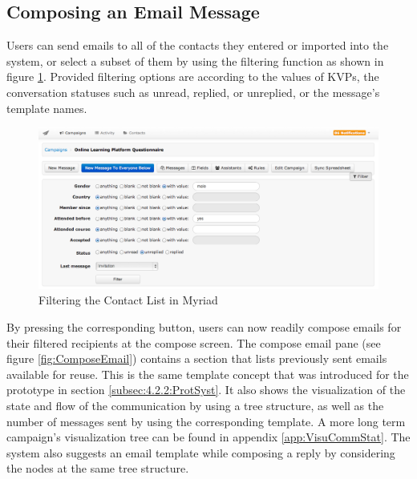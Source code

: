 \clearpage

\subsection{Composing an Email Message}
\label{subsec:5.2.4:CompEmaiMess}

Users can send emails to all of the contacts they entered or imported into the system, or select a subset of them by using the filtering function as shown in figure \ref{fig:ContactFilters}. Provided filtering options are according to the values of \ac{KVP}s, the conversation statuses such as unread, replied, or unreplied, or the message's template names.
\vspace{1cm}

\begin{figure}[htbp]
	\centering
	\includegraphics[width=1.00\textwidth]{imgs/ContactFilters.png}
	\caption[Filtering the Contact List in Myriad]{Filtering the Contact List in Myriad}
	\label{fig:ContactFilters}
\end{figure}

By pressing the corresponding button, users can now readily compose emails for their filtered recipients at the compose screen. The compose email pane (see figure \ref{fig:ComposeEmail}) contains a section that lists previously sent emails available for reuse. This is the same template concept that was introduced for the prototype in section \ref{subsec:4.2.2:ProtSyst}. It also shows the visualization of the state and flow of the communication by using a tree structure, as well as the number of messages sent by using the corresponding template. A more long term campaign's visualization tree can be found in appendix \ref{app:VisuCommStat}. The system also suggests an email template while composing a reply by considering the nodes at the same tree structure.
\vspace{1cm}

